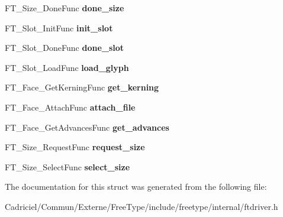 \begin{DoxyCompactItemize}
\item 
\hypertarget{struct_f_t___driver___class_rec___a5c96f627816a089b27bcff09f22dd1a6}{F\-T\-\_\-\-Size\-\_\-\-Done\-Func {\bfseries done\-\_\-size}}\label{struct_f_t___driver___class_rec___a5c96f627816a089b27bcff09f22dd1a6}

\item 
\hypertarget{struct_f_t___driver___class_rec___ae4e1d4ec7bdbdee0b4a5f8fc8f113d30}{F\-T\-\_\-\-Slot\-\_\-\-Init\-Func {\bfseries init\-\_\-slot}}\label{struct_f_t___driver___class_rec___ae4e1d4ec7bdbdee0b4a5f8fc8f113d30}

\item 
\hypertarget{struct_f_t___driver___class_rec___a548a343f5921f5d341142bf3743c42d4}{F\-T\-\_\-\-Slot\-\_\-\-Done\-Func {\bfseries done\-\_\-slot}}\label{struct_f_t___driver___class_rec___a548a343f5921f5d341142bf3743c42d4}

\item 
\hypertarget{struct_f_t___driver___class_rec___a49dbd71e64094d4d825b8b8d51dd4e47}{F\-T\-\_\-\-Slot\-\_\-\-Load\-Func {\bfseries load\-\_\-glyph}}\label{struct_f_t___driver___class_rec___a49dbd71e64094d4d825b8b8d51dd4e47}

\item 
\hypertarget{struct_f_t___driver___class_rec___a398395bfdbef65a8d531724d200ed91c}{F\-T\-\_\-\-Face\-\_\-\-Get\-Kerning\-Func {\bfseries get\-\_\-kerning}}\label{struct_f_t___driver___class_rec___a398395bfdbef65a8d531724d200ed91c}

\item 
\hypertarget{struct_f_t___driver___class_rec___a9caec9ae56a4bab9c90cede699279f29}{F\-T\-\_\-\-Face\-\_\-\-Attach\-Func {\bfseries attach\-\_\-file}}\label{struct_f_t___driver___class_rec___a9caec9ae56a4bab9c90cede699279f29}

\item 
\hypertarget{struct_f_t___driver___class_rec___aad560cd145b6d7cab7eae79194b1d724}{F\-T\-\_\-\-Face\-\_\-\-Get\-Advances\-Func {\bfseries get\-\_\-advances}}\label{struct_f_t___driver___class_rec___aad560cd145b6d7cab7eae79194b1d724}

\item 
\hypertarget{struct_f_t___driver___class_rec___a03ff7c2e4a2fb6d08eb481b03a78e8de}{F\-T\-\_\-\-Size\-\_\-\-Request\-Func {\bfseries request\-\_\-size}}\label{struct_f_t___driver___class_rec___a03ff7c2e4a2fb6d08eb481b03a78e8de}

\item 
\hypertarget{struct_f_t___driver___class_rec___a1b365eb82525dae0a816974d949fe0dd}{F\-T\-\_\-\-Size\-\_\-\-Select\-Func {\bfseries select\-\_\-size}}\label{struct_f_t___driver___class_rec___a1b365eb82525dae0a816974d949fe0dd}

\end{DoxyCompactItemize}


The documentation for this struct was generated from the following file\-:\begin{DoxyCompactItemize}
\item 
Cadriciel/\-Commun/\-Externe/\-Free\-Type/include/freetype/internal/ftdriver.\-h\end{DoxyCompactItemize}
